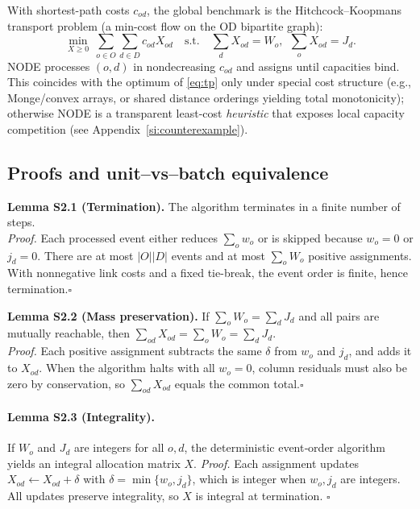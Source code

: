 With shortest-path costs $c_{od}$, the global benchmark is the Hitchcock–Koopmans transport problem (a min-cost flow on the OD bipartite graph):
\begin{equation}
    \label{eq:tp}
    \min_{X\ge 0}\ \sum_{o\in O}\sum_{d\in D} c_{od}X_{od}
    \quad\text{s.t.}\quad
    \sum_{d}X_{od}=W_o,\ \ \sum_{o}X_{od}=J_d.
\end{equation}
NODE processes $(o,d)$ in nondecreasing $c_{od}$ and assigns until capacities bind. This coincides with the optimum of \eqref{eq:tp} only under special cost structure (e.g., Monge/convex arrays, or shared distance orderings yielding total monotonicity); otherwise NODE is a transparent least-cost \emph{heuristic} that exposes local capacity competition (see Appendix~\ref{si:counterexample}).


\subsection{Proofs and unit–vs–batch equivalence}\label{si:proofs}

\textbf{Lemma S2.1 (Termination).} The algorithm terminates in a finite number of steps.\\
\emph{Proof.} Each processed event either reduces $\sum_o w_o$ or is skipped because $w_o=0$ or $j_d=0$. There are at most $|O||D|$ events and at most $\sum_o W_o$ positive assignments. With nonnegative link costs and a fixed tie-break, the event order is finite, hence termination.\hfill$\square$

\noindent\textbf{Lemma S2.2 (Mass preservation).} If $\sum_o W_o=\sum_d J_d$ and all pairs are mutually reachable, then $\sum_{od} X_{od}=\sum_o W_o=\sum_d J_d$.\\
\emph{Proof.} Each positive assignment subtracts the same $\delta$ from $w_o$ and $j_d$, and adds it to $X_{od}$. When the algorithm halts with all $w_o=0$, column residuals must also be zero by conservation, so $\sum_{od}X_{od}$ equals the common total.\hfill$\square$

\paragraph{Lemma S2.3 (Integrality).}
If $W_o$ and $J_d$ are integers for all $o,d$, the deterministic event‑order algorithm
yields an integral allocation matrix $X$.
\emph{Proof.} Each assignment updates $X_{od}\leftarrow X_{od}+\delta$ with
$\delta=\min\{w_o,j_d\}$, which is integer when $w_o,j_d$ are integers.
All updates preserve integrality, so $X$ is integral at termination. \hfill$\square$



